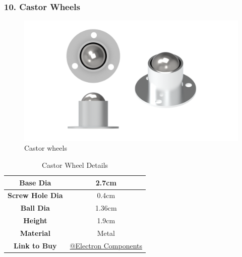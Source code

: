 \documentclass[12pt,a4paper,oneside]{book}
\begin{document}
			\subsubsection*{10. Castor Wheels}
				\begin{figure}[H]
					\centering					
					\includegraphics[scale=1]{CASTOR FULL}
					\caption{Castor wheels}	 
				\end{figure}
				\begin{table}[H]
				\centering
				\def\arraystretch{1.5}
					\caption{Castor Wheel Details}
					\vspace{0.5cm}
					\begin{tabular}{|c||c|}
					\hline
						\textbf{Base Dia} & 2.7cm\\\hline
						\textbf{Screw Hole Dia} & 0.4cm\\\hline
						\textbf{Ball Dia} & 1.36cm\\\hline
						\textbf{Height} & 1.9cm\\\hline
						\textbf{Material} & Metal\\\hline
						\textbf{Link to Buy} & \href{https://www.electroncomponents.com/Caster-wheel-robot-center-metal-ball-24mm}{@Electron Components}\\\hline
					\end{tabular}
				\end{table}
				\pagebreak
				
\end{document}
